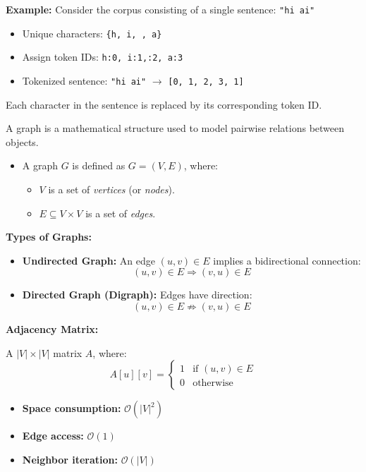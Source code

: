 \documentclass{article}
\begin{document}
\textbf{Example:} Consider the corpus consisting of a single sentence:  
\texttt{"hi ai"}

\begin{itemize}
    \item Unique characters: \texttt{\{h, i, \space, a\}}  
    \item Assign token IDs: \texttt{h:0,\ i:1,\space:2,\ a:3}
    \item Tokenized sentence: \texttt{"hi ai"} $\rightarrow$ \texttt{[0, 1, 2, 3, 1]}
\end{itemize}

Each character in the sentence is replaced by its corresponding token ID.


A graph is a mathematical structure used to model pairwise relations between objects.

\begin{itemize}
    \item A graph \( G \) is defined as \( G = (V, E) \), where:
    \begin{itemize}
        \item \( V \) is a set of \textit{vertices} (or \textit{nodes}).
        \item \( E \subseteq V \times V \) is a set of \textit{edges}.
    \end{itemize}
\end{itemize}

\textbf{Types of Graphs:}
\begin{itemize}
    \item \textbf{Undirected Graph:}  
    An edge \( (u, v) \in E \) implies a bidirectional connection:  
    \[
    (u, v) \in E \Rightarrow (v, u) \in E
    \]

    \item \textbf{Directed Graph (Digraph):}  
    Edges have direction:  
    \[
    (u, v) \in E \not\Rightarrow (v, u) \in E
    \]
\end{itemize}


\textbf{Adjacency Matrix:}

A \( |V| \times |V| \) matrix \( A \), where:
\[
A[u][v] = 
\begin{cases}
1 & \text{if } (u,v) \in E \\
0 & \text{otherwise}
\end{cases}
\]

\begin{itemize}
    \item \textbf{Space consumption:} \( \mathcal{O}(|V|^2) \)
    \item \textbf{Edge access:} \( \mathcal{O}(1) \)
    \item \textbf{Neighbor iteration:} \( \mathcal{O}(|V|) \)
\end{itemize}
\end{document}
